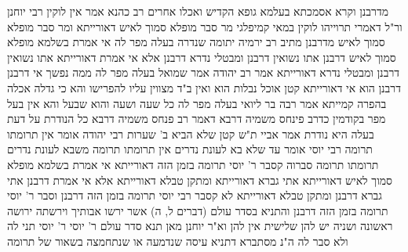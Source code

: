 \documentclass[12pt, openany]{book}
\begin{document}
{מדרבנן וקרא אסמכתא בעלמא 
גופא הקדיש ואכלו אחרים  רב כהנא  אמר אין לוקין רבי יוחנן ור"ל דאמרי תרוייהו  לוקין  במאי קמיפלגי  מר סבר  מופלא סמוך לאיש דאורייתא ומר סבר  מופלא סמוך לאיש מדרבנן 
מתיב רב ירמיה  יתומה שנדרה בעלה מפר לה  אי אמרת בשלמא מופלא סמוך לאיש דרבנן אתו נשואין דרבנן ומבטלי נדרא דרבנן  אלא אי אמרת דאורייתא אתו נשואין דרבנן ומבטלי נדרא דאורייתא 
אמר רב יהודה אמר שמואל  בעלה מפר לה ממה נפשך אי דרבנן דרבנן הוא אי דאורייתא קטן אוכל נבלות הוא ואין ב"ד מצווין עליו להפרישו 
והא כי גדלה אכלה בהפרה קמייתא 
אמר רבה בר ליואי  בעלה מפר לה כל שעה ושעה והוא שבעל 
והא אין בעל מפר בקודמין  כדרב פינחס משמיה דרבא דאמר רב פנחס משמיה דרבא  כל הנודרת על דעת בעלה היא נודרת 
אמר אביי  ת"ש קטן שלא הביא ב' שערות רבי יהודה אומר  אין תרומתו תרומה רבי יוסי אומר  עד שלא בא לעונת נדרים אין תרומתו תרומה משבא לעונת נדרים תרומתו תרומה 
סברוה  קסבר ר' יוסי תרומה בזמן הזה דאורייתא  אי אמרת בשלמא מופלא סמוך לאיש דאורייתא אתי גברא דאורייתא ומתקן טבלא דאורייתא  אלא אי אמרת דרבנן אתי גברא דרבנן ומתקן טבלא דאורייתא  לא קסבר רבי יוסי תרומה בזמן הזה דרבנן 
וסבר ר' יוסי תרומה בזמן הזה דרבנן  והתניא בסדר עולם  (דברים ל, ה) אשר ירשו אבותיך וירשתה
ירושה ראשונה ושניה יש להן שלישית אין להן 
וא"ר יוחנן  מאן תנא סדר עולם ר' יוסי 
ר' יוסי תני לה ולא סבר לה  ה"נ מסתברא דתניא  עיסה שנדמעה או שנתחמצה בשאור של תרומה}
\end{document}
